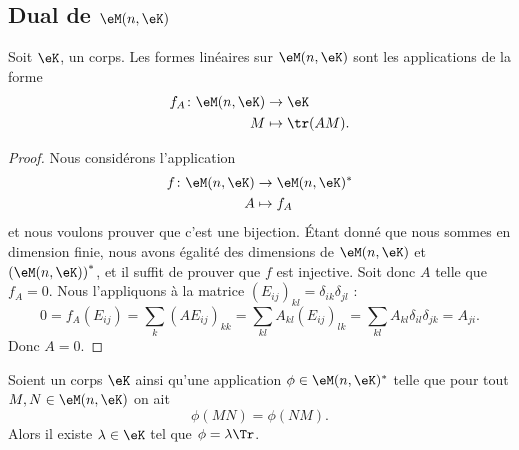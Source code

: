 \subsection{Dual de \texorpdfstring{\(  \eM(n,\eK)\)}{M(n,K)}}

\begin{proposition}     \label{PropHOjJpCa}
	Soit \( \eK\), un corps. Les formes linéaires sur \( \eM(n,\eK)\) sont les applications de la forme
	\begin{equation}
		\begin{aligned}
			f_A\colon \eM(n,\eK) & \to \eK          \\
			M                    & \mapsto \tr(AM).
		\end{aligned}
	\end{equation}
\end{proposition}


\begin{proof}
	Nous considérons l'application
	\begin{equation}
		\begin{aligned}
			f\colon \eM(n,\eK) & \to \eM(n,\eK)^* \\
			A                  & \mapsto f_A
		\end{aligned}
	\end{equation}
	et nous voulons prouver que c'est une bijection. Étant donné que nous sommes en dimension finie, nous avons égalité des dimensions de \( \eM(n,\eK)\) et \( \left(\eM(n,\eK)\right)^*\), et il suffit de prouver que \( f\) est injective. Soit donc \( A\) telle que \( f_A=0\). Nous l'appliquons à la matrice \( (E_{ij})_{kl}=\delta_{ik}\delta_{jl}\) :
	\begin{equation}
		0 = f_A(E_{ij})
		= \sum_{k}(AE_{ij})_{kk}
		= \sum_{kl}A_{kl}(E_{ij})_{lk}
		= \sum_{kl}A_{kl}\delta_{il}\delta_{jk}
		= A_{ji}.
	\end{equation}
	Donc \( A=0\).
\end{proof}

\begin{corollary}
	Soient un corps \( \eK\) ainsi qu'une application \( \phi\in\eM(n,\eK)^*\) telle que pour tout \( M,N\in \eM(n,\eK)\) on ait
	\begin{equation}
		\phi(MN)=\phi(NM).
	\end{equation}
	Alors il existe \( \lambda\in \eK\) tel que \( \phi=\lambda\Tr\).
\end{corollary}


